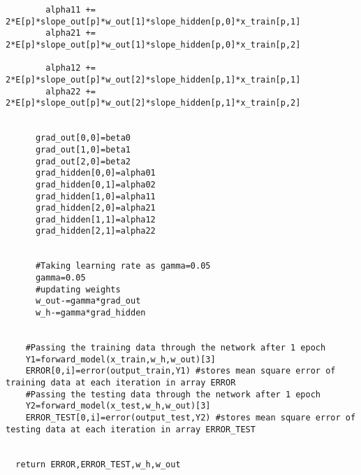 \documentclass[12pt,letterpaper, onecolumn]{exam}
\begin{document}
\begin{lstlisting}
        alpha11 += 2*E[p]*slope_out[p]*w_out[1]*slope_hidden[p,0]*x_train[p,1]
        alpha21 += 2*E[p]*slope_out[p]*w_out[1]*slope_hidden[p,0]*x_train[p,2]

        alpha12 += 2*E[p]*slope_out[p]*w_out[2]*slope_hidden[p,1]*x_train[p,1]
        alpha22 += 2*E[p]*slope_out[p]*w_out[2]*slope_hidden[p,1]*x_train[p,2]

      
      grad_out[0,0]=beta0
      grad_out[1,0]=beta1
      grad_out[2,0]=beta2
      grad_hidden[0,0]=alpha01
      grad_hidden[0,1]=alpha02
      grad_hidden[1,0]=alpha11
      grad_hidden[2,0]=alpha21
      grad_hidden[1,1]=alpha12
      grad_hidden[2,1]=alpha22
      

      #Taking learning rate as gamma=0.05
      gamma=0.05
      #updating weights
      w_out-=gamma*grad_out
      w_h-=gamma*grad_hidden
      
      
    #Passing the training data through the network after 1 epoch
    Y1=forward_model(x_train,w_h,w_out)[3]
    ERROR[0,i]=error(output_train,Y1) #stores mean square error of training data at each iteration in array ERROR 
    #Passing the testing data through the network after 1 epoch
    Y2=forward_model(x_test,w_h,w_out)[3]
    ERROR_TEST[0,i]=error(output_test,Y2) #stores mean square error of testing data at each iteration in array ERROR_TEST 
    

  return ERROR,ERROR_TEST,w_h,w_out

\end{lstlisting}
\end{document}
